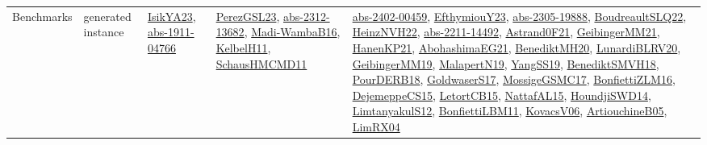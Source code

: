 {\begin{longtable}{llp{6cm}p{6cm}p{6cm}}
Benchmarks & generated instance & \href{articles/IsikYA23.pdf}{IsikYA23}\cite{IsikYA23}, \href{articles/abs-1911-04766.pdf}{abs-1911-04766}\cite{abs-1911-04766} & \href{papers/PerezGSL23.pdf}{PerezGSL23}\cite{PerezGSL23}, \href{articles/abs-2312-13682.pdf}{abs-2312-13682}\cite{abs-2312-13682}, \href{papers/Madi-WambaB16.pdf}{Madi-WambaB16}\cite{Madi-WambaB16}, \href{articles/KelbelH11.pdf}{KelbelH11}\cite{KelbelH11}, \href{articles/SchausHMCMD11.pdf}{SchausHMCMD11}\cite{SchausHMCMD11} & \href{articles/abs-2402-00459.pdf}{abs-2402-00459}\cite{abs-2402-00459}, \href{papers/EfthymiouY23.pdf}{EfthymiouY23}\cite{EfthymiouY23}, \href{articles/abs-2305-19888.pdf}{abs-2305-19888}\cite{abs-2305-19888}, \href{papers/BoudreaultSLQ22.pdf}{BoudreaultSLQ22}\cite{BoudreaultSLQ22}, \href{articles/HeinzNVH22.pdf}{HeinzNVH22}\cite{HeinzNVH22}, \href{articles/abs-2211-14492.pdf}{abs-2211-14492}\cite{abs-2211-14492}, \href{papers/Astrand0F21.pdf}{Astrand0F21}\cite{Astrand0F21}, \href{papers/GeibingerMM21.pdf}{GeibingerMM21}\cite{GeibingerMM21}, \href{papers/HanenKP21.pdf}{HanenKP21}\cite{HanenKP21}, \href{articles/AbohashimaEG21.pdf}{AbohashimaEG21}\cite{AbohashimaEG21}, \href{articles/BenediktMH20.pdf}{BenediktMH20}\cite{BenediktMH20}, \href{articles/LunardiBLRV20.pdf}{LunardiBLRV20}\cite{LunardiBLRV20}, \href{papers/GeibingerMM19.pdf}{GeibingerMM19}\cite{GeibingerMM19}, \href{papers/MalapertN19.pdf}{MalapertN19}\cite{MalapertN19}, \href{papers/YangSS19.pdf}{YangSS19}\cite{YangSS19}, \href{papers/BenediktSMVH18.pdf}{BenediktSMVH18}\cite{BenediktSMVH18}, \href{articles/PourDERB18.pdf}{PourDERB18}\cite{PourDERB18}, \href{papers/GoldwaserS17.pdf}{GoldwaserS17}\cite{GoldwaserS17}, \href{papers/MossigeGSMC17.pdf}{MossigeGSMC17}\cite{MossigeGSMC17}, \href{papers/BonfiettiZLM16.pdf}{BonfiettiZLM16}\cite{BonfiettiZLM16}, \href{papers/DejemeppeCS15.pdf}{DejemeppeCS15}\cite{DejemeppeCS15}, \href{articles/LetortCB15.pdf}{LetortCB15}\cite{LetortCB15}, \href{articles/NattafAL15.pdf}{NattafAL15}\cite{NattafAL15}, \href{papers/HoundjiSWD14.pdf}{HoundjiSWD14}\cite{HoundjiSWD14}, \href{articles/LimtanyakulS12.pdf}{LimtanyakulS12}\cite{LimtanyakulS12}, \href{papers/BonfiettiLBM11.pdf}{BonfiettiLBM11}\cite{BonfiettiLBM11}, \href{papers/KovacsV06.pdf}{KovacsV06}\cite{KovacsV06}, \href{papers/ArtiouchineB05.pdf}{ArtiouchineB05}\cite{ArtiouchineB05}, \href{papers/LimRX04.pdf}{LimRX04}\cite{LimRX04}\\

\end{longtable}}
